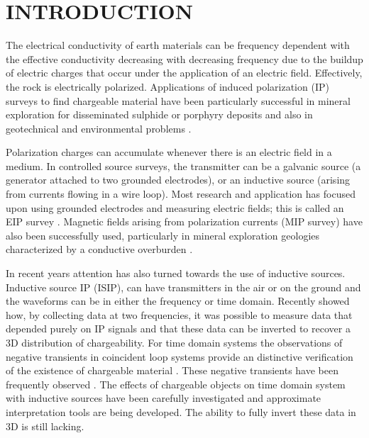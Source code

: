 \documentclass[letterpaper,11pt]{article}
\title{\normalsize}
\begin{document}

\newpage

\tableofcontents
\newpage

\section{INTRODUCTION}
The electrical conductivity of earth materials can be frequency dependent with the effective conductivity decreasing with decreasing frequency due to the buildup of electric charges that occur under the application of an electric field. Effectively, the rock is electrically polarized. 
Applications of induced polarization (IP) surveys to find chargeable material  have been particularly successful in mineral exploration for disseminated sulphide or porphyry deposits \cite[]{Pelton1978, Fink1990} and also in geotechnical and environmental problems \cite[]{Kemna2012}. 

Polarization charges can accumulate whenever there is an electric field in a medium. In controlled source surveys, the transmitter can be a galvanic source (a generator attached to two grounded electrodes), or an inductive source (arising from currents flowing in a wire loop). Most research and application has focused upon using grounded electrodes and measuring electric fields; this is called an EIP survey \cite[]{seigel1959}. Magnetic fields arising from polarization currents (MIP survey) have also been successfully used, particularly in mineral exploration geologies characterized by a conductive overburden \cite[]{seigel1974}. 

In recent years attention has also turned towards the use of inductive sources. Inductive source IP (ISIP), can have transmitters in the air or on the ground and the waveforms can be in either the frequency or time domain. Recently  \cite[]{Marchant2012b} showed how, by collecting data at two frequencies, it was possible to measure data that depended purely on IP signals and that these data can be inverted to recover a 3D distribution of chargeability. 
For time domain systems the observations of negative transients in coincident loop systems provide an distinctive verification of the existence of chargeable material \cite[]{Weidelt1982}. These negative transients have been frequently observed \cite[]{SmithandKlein,Kang2015a}. The effects of chargeable objects on time domain system with inductive sources have been carefully investigated \cite[]{Smith1988a,Flis1989,ElKaliouby2004, Marchant2014} and approximate interpretation tools \cite[]{Kratzer2012,Hodges2014,Kwan2015} are being developed. The ability to fully invert these data in 3D is still lacking. 
\end{document}
